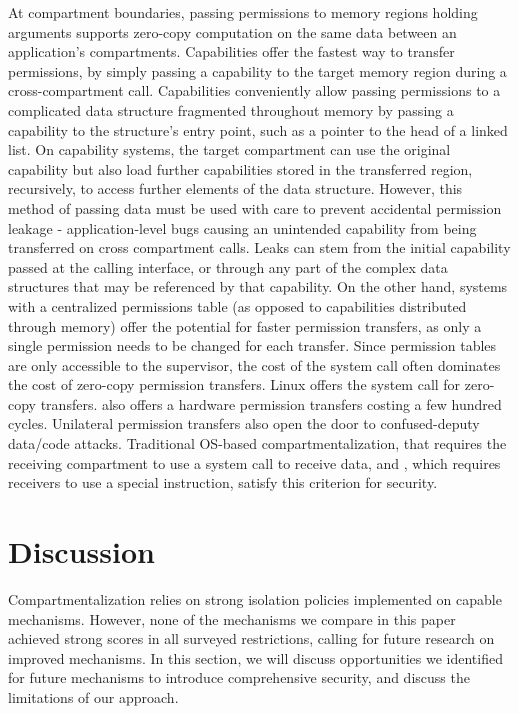 At compartment boundaries, passing permissions to memory regions holding 
arguments supports zero-copy computation on the same data between 
an application's compartments.
Capabilities offer the fastest way to transfer permissions, by simply passing
a capability to the target memory region during a cross-compartment call.
Capabilities conveniently allow passing permissions to a complicated
data structure fragmented throughout memory by passing a capability to the
structure's entry point, such as a pointer to the head of a linked list.
On capability systems, the target compartment can use the original capability
but also load further capabilities stored in the transferred region, recursively,
to access further elements of the data structure.
However, this method of passing data must be used with care to prevent
accidental permission leakage - application-level bugs causing an unintended
capability from being transferred on cross compartment calls.
Leaks can stem from the initial capability passed at the calling interface,
or through any part of the complex data structures that may be referenced by
that capability.
On the other hand, systems with a centralized permissions table (as opposed to
capabilities distributed through memory) offer the potential for faster permission
transfers, as only a single permission needs to be changed for each transfer.
Since permission tables are only accessible to the supervisor,
the cost of the system call often dominates the cost of zero-copy permission transfers.
Linux offers the  system call for zero-copy transfers.
\seccells also offers a hardware permission transfers costing a few hundred cycles.
Unilateral permission transfers also open the door to confused-deputy data/code attacks.
Traditional OS-based compartmentalization, that requires the receiving compartment to
use a system call to receive data, and \seccells, which requires receivers to use a
special instruction, satisfy this criterion for security.

\section{Discussion}
\label{sec:compsok:discussion}
Compartmentalization relies on strong isolation policies implemented on capable
mechanisms. 
However, none of the mechanisms we compare in this paper achieved strong scores in
all surveyed restrictions, calling for future research on improved mechanisms.
In this section, we will discuss opportunities we identified for future mechanisms
to introduce comprehensive security, and discuss the limitations of our approach.

